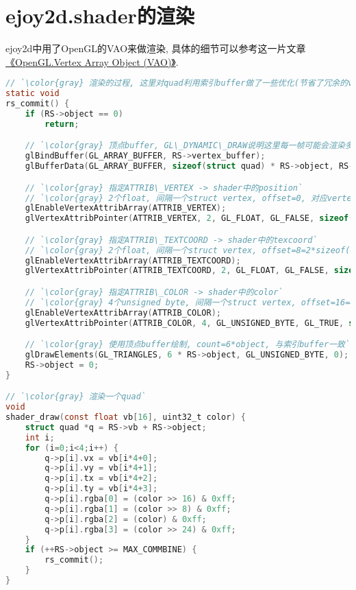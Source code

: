 \section {\ZHH ejoy2d.shader的渲染} {

    {ejoy2d中用了OpenGL的VAO来做渲染, 具体的细节可以参考这一片文章 \href{http://www.cppblog.com/init/archive/2012/02/21/166098.html}{《OpenGL.Vertex Array Object (VAO)》}. }\par

\begin{lstlisting}[language=C]
// `\color{gray} 渲染的过程, 这里对quad利用索引buffer做了一些优化(节省了冗余的vertex)`
static void
rs_commit() {
    if (RS->object == 0)
        return;

    // `\color{gray} 顶点buffer, GL\_DYNAMIC\_DRAW说明这里每一帧可能会渲染多次`
    glBindBuffer(GL_ARRAY_BUFFER, RS->vertex_buffer);
    glBufferData(GL_ARRAY_BUFFER, sizeof(struct quad) * RS->object, RS->vb, GL_DYNAMIC_DRAW);

    // `\color{gray} 指定ATTRIB\_VERTEX -> shader中的position`
    // `\color{gray} 2个float, 间隔一个struct vertex, offset=0, 对应vertex->vx, vertex->vy`
    glEnableVertexAttribArray(ATTRIB_VERTEX);
    glVertexAttribPointer(ATTRIB_VERTEX, 2, GL_FLOAT, GL_FALSE, sizeof(struct vertex), BUFFER_OFFSET(0));

    // `\color{gray} 指定ATTRIB\_TEXTCOORD -> shader中的texcoord`
    // `\color{gray} 2个float, 间隔一个struct vertex, offset=8=2*sizeof(GL\_FLOAT) 对应vertex->tx, vertex->ty`
    glEnableVertexAttribArray(ATTRIB_TEXTCOORD);
    glVertexAttribPointer(ATTRIB_TEXTCOORD, 2, GL_FLOAT, GL_FALSE, sizeof(struct vertex), BUFFER_OFFSET(8));

    // `\color{gray} 指定ATTRIB\_COLOR -> shader中的color`
    // `\color{gray} 4个unsigned byte, 间隔一个struct vertex, offset=16=4*sizeof(GL\_FLOAT) 对应vertex->rgba`
    glEnableVertexAttribArray(ATTRIB_COLOR);
    glVertexAttribPointer(ATTRIB_COLOR, 4, GL_UNSIGNED_BYTE, GL_TRUE, sizeof(struct vertex), BUFFER_OFFSET(16));

    // `\color{gray} 使用顶点buffer绘制, count=6*object, 与索引buffer一致`
    glDrawElements(GL_TRIANGLES, 6 * RS->object, GL_UNSIGNED_BYTE, 0);
    RS->object = 0;
}

// `\color{gray} 渲染一个quad`
void
shader_draw(const float vb[16], uint32_t color) {
    struct quad *q = RS->vb + RS->object;
    int i;
    for (i=0;i<4;i++) {
        q->p[i].vx = vb[i*4+0];
        q->p[i].vy = vb[i*4+1];
        q->p[i].tx = vb[i*4+2];
        q->p[i].ty = vb[i*4+3];
        q->p[i].rgba[0] = (color >> 16) & 0xff;
        q->p[i].rgba[1] = (color >> 8) & 0xff;
        q->p[i].rgba[2] = (color) & 0xff;
        q->p[i].rgba[3] = (color >> 24) & 0xff;
    }
    if (++RS->object >= MAX_COMMBINE) {
        rs_commit();
    }
}



\end{lstlisting}}
